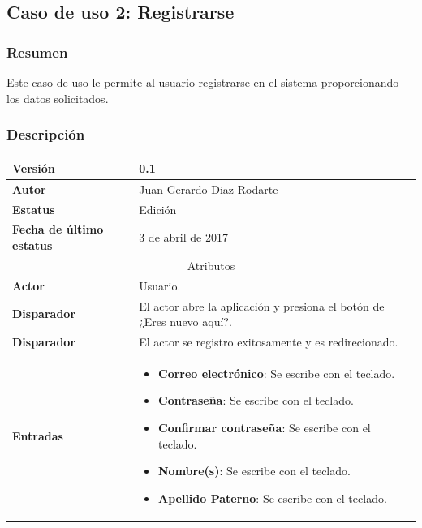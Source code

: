 \subsection{Caso de uso 2: Registrarse} \label{cu2}
\subsubsection{Resumen}
Este caso de uso le permite al usuario registrarse en el sistema proporcionando los datos solicitados.
\subsubsection{Descripción}
\begingroup
\setlength{\LTleft}{-10cm plus -1fill}
\setlength{\LTright}{\LTleft}
\begin{center}
  \addtocounter{table}{-1}
   \label{tab:cu2_tab}
  \begin{longtable}{| p{3.5cm} | p{11.5cm} |}
      	\hline
      		\textbf{Versión} &  0.1 \\
        \hline 
       		\textbf{Autor} & Juan Gerardo Diaz Rodarte\\
        \hline
          \textbf{Estatus} & Edición \\
        \hline  
          \textbf{Fecha de último estatus} &  3 de abril de 2017 \\
        \hline
      \multicolumn{2}{|c|}{\large{Atributos}} \\
        \hline
          \textbf{Actor} & Usuario. \\
        \hline	
          \textbf{Disparador} & El actor abre la aplicación y presiona el botón de ¿Eres nuevo aquí?. \\
        \hline
          \textbf{Disparador} & El actor se registro exitosamente y es redirecionado. \\
        \hline
          \textbf{Entradas} & 
            \begin{itemize}
              \item \textbf{Correo electrónico}: Se escribe con el teclado.
              \item \textbf{Contraseña}: Se escribe con el teclado.
              \item \textbf{Confirmar contraseña}: Se escribe con el teclado.
              \item \textbf{Nombre(s)}: Se escribe con el teclado.
              \item \textbf{Apellido Paterno}: Se escribe con el teclado.

\end{itemize}
\end{longtable}
\end{center}
